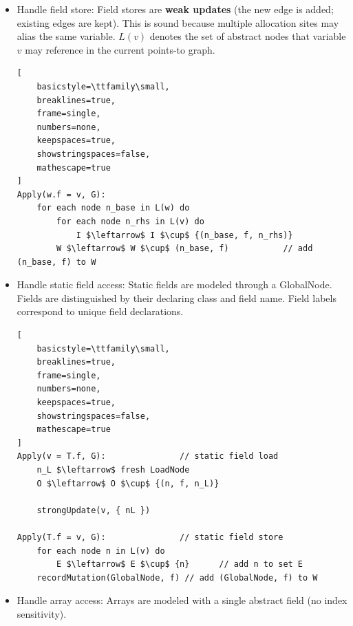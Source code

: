 \begin{itemize}
\begin{lstlisting}[
    basicstyle=\ttfamily\small,
    breaklines=true,
    frame=single,
    numbers=none,
    keepspaces=true,
    showstringspaces=false,
    mathescape=true
]
IsPrestateReachable(n):
    return n is ParameterNode or LoadNode or GlobalNode
\end{lstlisting}

\item[e] Handle field store: \label{agl4e} \newline
Field stores are \textbf{weak updates} (the new edge is added; existing edges are kept). This is sound because multiple allocation sites may alias the same variable. $L(v)$ denotes the set of abstract nodes that variable $v$ may reference in the current points-to graph.


\begin{lstlisting}[
    basicstyle=\ttfamily\small,
    breaklines=true,
    frame=single,
    numbers=none,
    keepspaces=true,
    showstringspaces=false,
    mathescape=true
]
Apply(w.f = v, G):
    for each node n_base in L(w) do
        for each node n_rhs in L(v) do
            I $\leftarrow$ I $\cup$ {(n_base, f, n_rhs)}
        W $\leftarrow$ W $\cup$ (n_base, f)           // add (n_base, f) to W
\end{lstlisting}

\item[f] Handle static field access: \label{agl4f} \newline
Static fields are modeled through a  GlobalNode. Fields are distinguished by their declaring class and field name. Field labels correspond to unique field declarations.

\begin{lstlisting}[
    basicstyle=\ttfamily\small,
    breaklines=true,
    frame=single,
    numbers=none,
    keepspaces=true,
    showstringspaces=false,
    mathescape=true
]
Apply(v = T.f, G):               // static field load
    n_L $\leftarrow$ fresh LoadNode
    O $\leftarrow$ O $\cup$ {(n, f, n_L)}

    strongUpdate(v, { nL })

Apply(T.f = v, G):               // static field store
    for each node n in L(v) do
        E $\leftarrow$ E $\cup$ {n}      // add n to set E
    recordMutation(GlobalNode, f) // add (GlobalNode, f) to W
\end{lstlisting}

\item[g] Handle array access: \label{agl4g} \newline
Arrays are modeled with a single abstract field (no index sensitivity).


\end{itemize}
